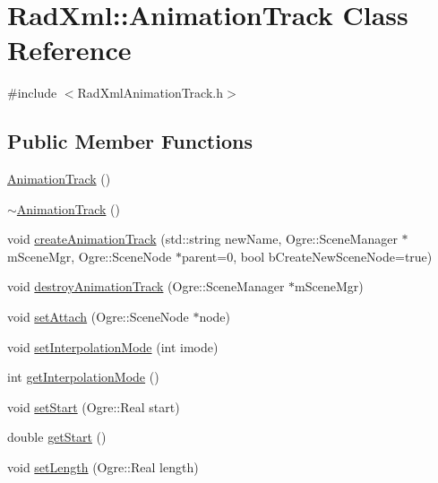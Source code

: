 \hypertarget{class_rad_xml_1_1_animation_track}{\section{Rad\-Xml\-:\-:Animation\-Track Class Reference}
\label{class_rad_xml_1_1_animation_track}
}


{\ttfamily \#include $<$Rad\-Xml\-Animation\-Track.\-h$>$}

\subsection*{Public Member Functions}
\begin{DoxyCompactItemize}
\item 
\hyperlink{class_rad_xml_1_1_animation_track_a2d8a8b2007c25c59977b8cbdcab59fe9}{Animation\-Track} ()
\item 
\hyperlink{class_rad_xml_1_1_animation_track_a2f9ad28781b56c86a3d147b0f591531e}{$\sim$\-Animation\-Track} ()
\item 
void \hyperlink{class_rad_xml_1_1_animation_track_ae4aa589dd2c07b92f95f57d2b6d949ae}{create\-Animation\-Track} (std\-::string new\-Name, Ogre\-::\-Scene\-Manager $\ast$m\-Scene\-Mgr, Ogre\-::\-Scene\-Node $\ast$parent=0, bool b\-Create\-New\-Scene\-Node=true)
\item 
void \hyperlink{class_rad_xml_1_1_animation_track_a2fa7e0a08935b31e4e3dfa9f16850f5d}{destroy\-Animation\-Track} (Ogre\-::\-Scene\-Manager $\ast$m\-Scene\-Mgr)
\item 
void \hyperlink{class_rad_xml_1_1_animation_track_a98f89dd36c200452b4e785b2d5ad0bb2}{set\-Attach} (Ogre\-::\-Scene\-Node $\ast$node)
\item 
void \hyperlink{class_rad_xml_1_1_animation_track_a1e8daeb4b3781cd4aa05485bea1e1a80}{set\-Interpolation\-Mode} (int imode)
\item 
int \hyperlink{class_rad_xml_1_1_animation_track_aaaea5cc0de2a55eb26797b1246626162}{get\-Interpolation\-Mode} ()
\item 
void \hyperlink{class_rad_xml_1_1_animation_track_a283f5589564df2e4140a63386cdc8782}{set\-Start} (Ogre\-::\-Real start)
\item 
double \hyperlink{class_rad_xml_1_1_animation_track_aee5ea61e071221b49b302c3834f84414}{get\-Start} ()
\item 
void \hyperlink{class_rad_xml_1_1_animation_track_a46d85649bf7e9d0b2dc1e036eaccbdf0}{set\-Length} (Ogre\-::\-Real length)
\item 

\end{DoxyCompactItemize}
